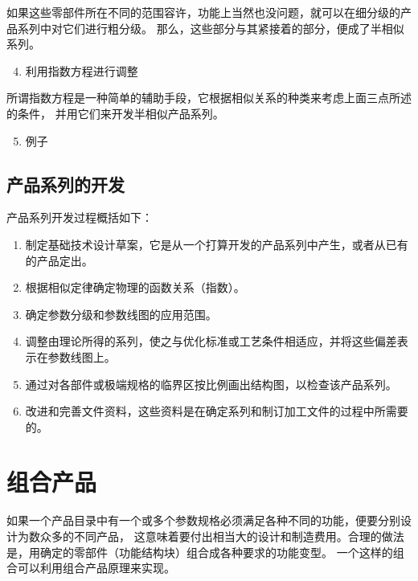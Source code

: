\documentclass[letterpaper,10pt,english]{sphinxmanual}
\begin{document}
如果这些零部件所在不同的范围容许，功能上当然也没问题，就可以在细分级的产品系列中对它们进行粗分级。
那么，这些部分与其紧接着的部分，便成了半相似系列。
\begin{enumerate}
\setcounter{enumi}{3}
\item {} 
利用指数方程进行调整

\end{enumerate}

所谓指数方程是一种简单的辅助手段，它根据相似关系的种类来考虑上面三点所述的条件，
并用它们来开发半相似产品系列。
\begin{enumerate}
\setcounter{enumi}{4}
\item {} 
例子

\end{enumerate}


\subsection{产品系列的开发}
\label{unit7:id8}
产品系列开发过程概括如下：
\begin{enumerate}
\item {} 
制定基础技术设计草案，它是从一个打算开发的产品系列中产生，或者从已有的产品定出。

\item {} 
根据相似定律确定物理的函数关系（指数）。

\item {} 
确定参数分级和参数线图的应用范围。

\item {} 
调整由理论所得的系列，使之与优化标准或工艺条件相适应，并将这些偏差表示在参数线图上。

\item {} 
通过对各部件或极端规格的临界区按比例画出结构图，以检查该产品系列。

\item {} 
改进和完善文件资料，这些资料是在确定系列和制订加工文件的过程中所需要的。

\end{enumerate}


\section{组合产品}
\label{unit7:id9}
如果一个产品目录中有一个或多个参数规格必须满足各种不同的功能，便要分别设计为数众多的不同产品，
这意味着要付出相当大的设计和制造费用。合理的做法是，用确定的零部件（功能结构块）组合成各种要求的功能变型。
一个这样的组合可以利用组合产品原理来实现。
\end{document}
